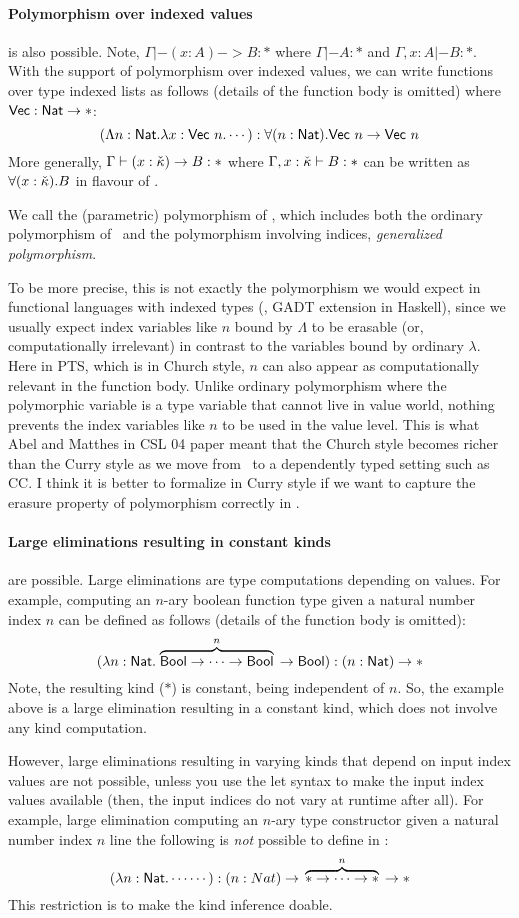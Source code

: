 \paragraph{Polymorphism over indexed values} is also possible.
Note, $\Gamma |- (x:A) -> B : *$ where $\Gamma |- A:*$ and $\Gamma,x:A |- B:*$.
With the support of polymorphism over indexed values, we can write functions
over type indexed lists as follows (details of the function body is omitted)
where $\mathsf{Vec} : \mathsf{Nat} -> *$:
\[
(\Lambda n:\mathsf{Nat}.\lambda x:\mathsf{Vec}~n. \cdots) : \forall(n:\mathsf{Nat}).\mathsf{Vec}~n -> \mathsf{Vec}~n 
\]
More generally, $\Gamma |- (x:{\check\kappa}) -> B : *$ where $\Gamma, x:{\check\kappa} |- B:*$
can be written as $\forall(x:{\check\kappa}).B$ in flavour of \Fw.

We call the (parametric) polymorphism of \Fi, which includes
both the ordinary polymorphism of \Fw\ and the polymorphism involving indices,
\emph{generalized polymorphism}.

To be more precise, this is not exactly the polymorphism we would expect
in functional languages with indexed types (\eg, GADT extension in Haskell),
since we usually expect index variables like $n$ bound by $\Lambda$ to be
erasable (or, computationally irrelevant) in contrast to the variables bound
by ordinary $\lambda$. Here in PTS, which is in Church style, $n$ can also
appear as computationally relevant in the function body. Unlike ordinary
polymorphism where the polymorphic variable is a type variable that cannot
live in value world, nothing prevents the index variables like $n$ to be used
in the value level. This is what Abel and Matthes in CSL 04 paper meant that
the Church style becomes richer than the Curry style as we move from \Fw\ to
a dependently typed setting such as CC. I think it is better to formalize
in Curry style if we want to capture the erasure property of polymorphism
correctly in \Fi.

\paragraph{Large eliminations resulting in constant kinds} are possible.
Large eliminations are type computations depending on values.  For example,
computing an $n$-ary boolean function type given a natural number index $n$
can be defined as follows (details of the function body is omitted):
\[
(\lambda n:\mathsf{Nat}. \stackrel{n}{\overbrace{\mathsf{Bool}-> \cdots-> \mathsf{Bool}}}\;\, -> \mathsf{Bool})
  : (n:\mathsf{Nat}) -> *
\]
Note, the resulting kind ($*$) is constant, being independent of $n$.
So, the example above is a large elimination resulting in a constant kind,
which does not involve any kind computation.

However, large eliminations resulting in varying kinds that depend on
input index values are not possible, unless you use the let syntax to make
the input index values available (then, the input indices do not vary
at runtime after all). For example, large elimination computing an $n$-ary
type constructor given a natural number index $n$ line the following
is \emph{not} possible to define in \Fi:
\[
(\lambda n:\mathsf{Nat}. \cdots \cdots)
  : (n:Nat) -> \,\;\stackrel{n}{\overbrace{* -> \cdots -> *}}\;\, -> *
\]
This restriction is to make the kind inference doable.


